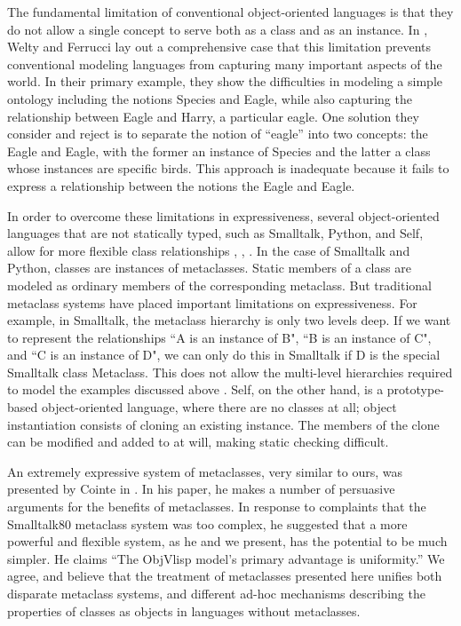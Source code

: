 \documentclass{acmconfbig}
\begin{document}
The fundamental limitation of conventional object-oriented languages
is that they do not allow a single concept to serve both as a class
and as an instance.  In \cite{FW96}, Welty and Ferrucci lay out a
comprehensive case that this limitation prevents conventional modeling
languages from capturing many important aspects of the world.  In
their primary example, they show the difficulties in modeling a simple
ontology including the notions {\txt Species} and {\txt Eagle}, while
also capturing the relationship between {\txt Eagle} and {\txt Harry},
a particular eagle.  One solution they consider and reject is to
separate the notion of ``eagle'' into two concepts: {\txt the Eagle}
and {\txt Eagle}, with the former an instance of {\txt Species} and
the latter a class whose instances are specific birds.  This approach
is inadequate because it fails to express a relationship between the
notions {\txt the Eagle} and {\txt Eagle}.

In order to overcome these limitations in expressiveness, several
object-oriented languages that are not statically typed, such as
Smalltalk, Python, and Self, allow for more flexible class
relationships \cite{Smalltalk80}, \cite{ArtMOP}, \cite{PythonMeta}. In
the case of Smalltalk and Python, classes are instances of
metaclasses. Static members of a class are modeled as ordinary members
of the corresponding metaclass.  But traditional metaclass systems
have placed important limitations on expressiveness.  For example, in
Smalltalk, the metaclass hierarchy is only two levels deep.  If we
want to represent the relationships ``{\txt A} is an instance of {\txt
B}", ``{\txt B} is an instance of {\txt C}", and ``{\txt C} is an
instance of {\txt D}", we can only do this in Smalltalk if {\txt D} is
the special Smalltalk class {\txt Metaclass}.  This does not allow the
multi-level hierarchies required to model the examples discussed above
\cite{Smalltalk80}.  Self, on the other hand, is a prototype-based
object-oriented language, where there are no classes at all; object
instantiation consists of cloning an existing instance. The members of
the clone can be modified and added to at will, making static checking
difficult.

An extremely expressive system of metaclasses, very similar to ours,
was presented by Cointe in \cite{objvlisp}.  In his paper, he makes a
number of persuasive arguments for the benefits of metaclasses.
In response to complaints that the Smalltalk80 metaclass system was
too complex, he suggested that a more powerful and flexible system, as
he and we present, has the potential to be much simpler.
He claims ``The ObjVlisp model's primary advantage is uniformity.''
We agree, and believe that the treatment of metaclasses presented here
unifies both disparate metaclass systems, and different ad-hoc
mechanisms describing the properties of classes as objects in
languages without metaclasses.
\end{document}
